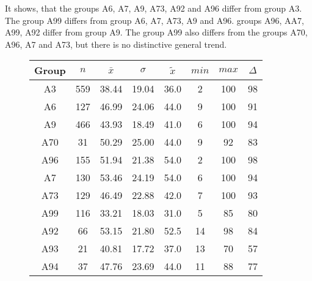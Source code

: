 It shows, that the groups A6, A7, A9, A73, A92 and A96 differ from group A3. The group A99 differs from group A6, A7, A73, A9 and A96. groups A96, AA7, A99, A92 differ from group A9. The group A99 also differs from the groups A70, A96, A7 and A73, but there is no distinctive general trend. 
\begin{figure}[ht!]
	\centering
	\begin{minipage}{0.5\textwidth}
		\tiny
		\setlength{\tabcolsep}{4pt}
		\centering
		\begin{tabular}{c|c|c|c|c|c|c|c}
			\toprule
			Group & $n$ & $\bar{x}$ & $\sigma$ & $\tilde{x}$ & $min$ & $max$ & $\Delta$ \\
			\midrule
			A3  & 559 & 38.44 & 19.04 & 36.0 & 2  & 100 & 98 \\ 
			A6  & 127 & 46.99 & 24.06 & 44.0 & 9  & 100 & 91 \\ 
			A9  & 466 & 43.93 & 18.49 & 41.0 & 6  & 100 & 94 \\ 
			A70 & 31  & 50.29 & 25.00 & 44.0 & 9  & 92  & 83 \\ 
			A96 & 155 & 51.94 & 21.38 & 54.0 & 2  & 100 & 98 \\ 
			A7  & 130 & 53.46 & 24.19 & 54.0 & 6  & 100 & 94 \\ 
			A73 & 129 & 46.49 & 22.88 & 42.0 & 7  & 100 & 93 \\ 
			A99 & 116 & 33.21 & 18.03 & 31.0 & 5  & 85  & 80 \\ 
			A92 & 66  & 53.15 & 21.80 & 52.5 & 14 & 98  & 84 \\ 
			A93 & 21  & 40.81 & 17.72 & 37.0 & 13 & 70  & 57 \\ 
			A94 & 37  & 47.76 & 23.69 & 44.0 & 11 & 88  & 77 \\ 
			\bottomrule
		\end{tabular}
		\label{tbl:descriptives_baysis_matched_Str_Cov}
	\end{minipage}%
	\begin{minipage}{0.55\textwidth}
\end{minipage}
\end{figure}
